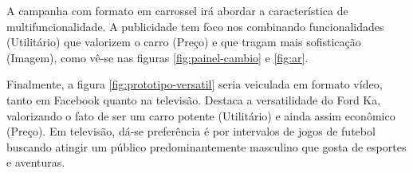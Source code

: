 A campanha com formato em carrossel irá abordar a característica de
multifuncionalidade. A publicidade tem foco nos \nomeCa{} combinando
funcionalidades (Utilitário) que valorizem o carro (Preço) e que tragam
mais sofisticação (Imagem), como vê-se nas figuras \ref{fig:painel-cambio}
e \ref{fig:ar}.

Finalmente, a figura \ref{fig:prototipo-versatil} seria veiculada
em formato vídeo, tanto em Facebook quanto na televisão. Destaca a
versatilidade do Ford Ka\texttrademark, valorizando o fato de ser
um carro potente (Utilitário) e ainda assim econômico (Preço). Em
televisão, dá-se preferência é por intervalos de jogos de futebol
buscando atingir um público predominantemente masculino que gosta
de esportes e aventuras. 

